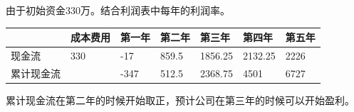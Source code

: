 \documentclass[UTF8]{ctexart}
\begin{document}
由于初始资金330万。结合利润表中每年的利润率。
\begin{table}[H]
	\centering
	\begin{tabular}{|l|l|l|l|l|l|l|}
	\hline
		  & 成本费用 & 第一年  & 第二年   & 第三年     & 第四年     & 第五年  \\ \hline
	现金流   & 330  & -17  & 859.5 & 1856.25 & 2132.25 & 2226 \\ \hline
	累计现金流 &      & -347 & 512.5 & 2368.75 & 4501    & 6727 \\ \hline
	\end{tabular}
	\end{table}
	累计现金流在第二年的时候开始取正，预计公司在第三年的时候可以开始盈利。
\end{document}
